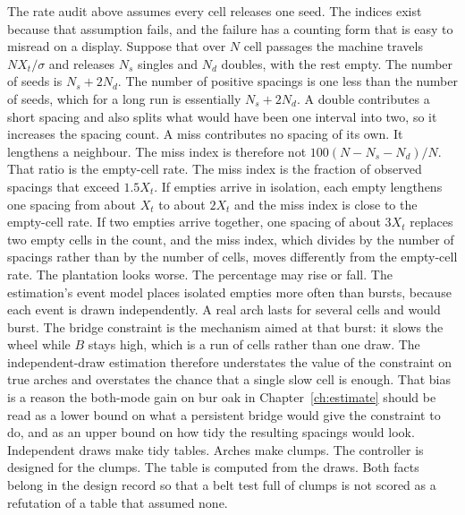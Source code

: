 The rate audit above assumes every cell releases one seed. The indices exist because that assumption fails, and the failure has a counting form that is easy to misread on a display. Suppose that over $N$ cell passages the machine travels $N X_t/\sigma$ and releases $N_s$ singles and $N_d$ doubles, with the rest empty. The number of seeds is $N_s+2N_d$. The number of positive spacings is one less than the number of seeds, which for a long run is essentially $N_s+2N_d$. A double contributes a short spacing and also splits what would have been one interval into two, so it increases the spacing count. A miss contributes no spacing of its own. It lengthens a neighbour. The miss index is therefore not $100(N-N_s-N_d)/N$. That ratio is the empty-cell rate. The miss index is the fraction of observed spacings that exceed $1.5X_t$. If empties arrive in isolation, each empty lengthens one spacing from about $X_t$ to about $2X_t$ and the miss index is close to the empty-cell rate. If two empties arrive together, one spacing of about $3X_t$ replaces two empty cells in the count, and the miss index, which divides by the number of spacings rather than by the number of cells, moves differently from the empty-cell rate. The plantation looks worse. The percentage may rise or fall. The estimation's event model places isolated empties more often than bursts, because each event is drawn independently. A real arch lasts for several cells and would burst. The bridge constraint is the mechanism aimed at that burst: it slows the wheel while $B$ stays high, which is a run of cells rather than one draw. The independent-draw estimation therefore understates the value of the constraint on true arches and overstates the chance that a single slow cell is enough. That bias is a reason the both-mode gain on bur oak in Chapter~\ref{ch:estimate} should be read as a lower bound on what a persistent bridge would give the constraint to do, and as an upper bound on how tidy the resulting spacings would look. Independent draws make tidy tables. Arches make clumps. The controller is designed for the clumps. The table is computed from the draws. Both facts belong in the design record so that a belt test full of clumps is not scored as a refutation of a table that assumed none.

